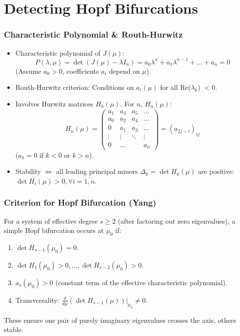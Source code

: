\documentclass[aspectratio=169]{beamer}
\begin{document}
\section{Detecting Hopf Bifurcations}

\begin{frame}{\insertsectionhead}
	\frametitle{Characteristic Polynomial \& Routh-Hurwitz}
	\begin{itemize}
		\item Characteristic polynomial of $J(\mu)$:
			$$ P(\lambda, \mu) = \det(J(\mu) - \lambda I_n) = a_0\lambda^n + a_1\lambda^{n-1} + \dots + a_n = 0 $$
			(Assume $a_0 > 0$, coefficients $a_i$ depend on $\mu$).
		\item \alert{Routh-Hurwitz criterion}: Conditions on $a_i(\mu)$ for all Re($\lambda_k$) $< 0$.
		\item Involves \alert{Hurwitz matrices} $H_k(\mu)$. For $n$, $H_n(\mu)$:
			$$  H_n(\mu) =
			\begin{pmatrix}
				a_1 & a_3 & a_5 & \dots \\
				a_0 & a_2 & a_4 & \dots \\
				0 & a_1 & a_3 & \dots \\
				\vdots & \vdots & \ddots & \vdots \\
				0 & \dots & & a_n
			\end{pmatrix}
			= (a_{2j - i})_{ij}$$
			($a_k = 0$ if $k<0$ or $k>n$).
		\item Stability $\iff$ all leading principal minors $\Delta_k = \det H_k(\mu)$ are positive: $\det H_i(\mu) > 0, \forall i = \overline{1,n}$.
	\end{itemize}
\end{frame}

\begin{frame}{\insertsectionhead}
	\frametitle{Criterion for Hopf Bifurcation (Yang)}
	For a system of effective degree $s \ge 2$ (after factoring out zero eigenvalues), a simple Hopf bifurcation occurs at $\mu_0$ if:
	\begin{enumerate}
		\item $\det H_{s-1}(\mu_0) = 0$.
		\item $\det H_1(\mu_0) > 0, \dots, \det H_{s-2}(\mu_0) > 0$.
		\item $a_s(\mu_0) > 0$ (constant term of the effective characteristic polynomial).
		\item Transversality: $\frac{d}{d\mu}(\det H_{s-1}(\mu))\bigg|_{\mu_0} \neq 0$.
	\end{enumerate}
	These ensure one pair of purely imaginary eigenvalues crosses the axis, others stable.
\end{frame}
\end{document}
